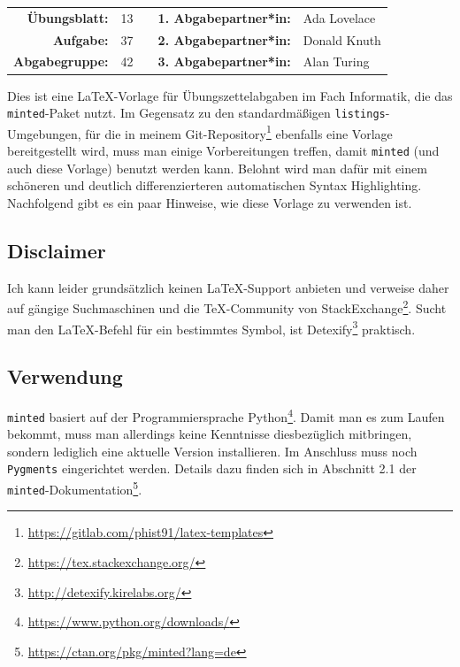 
\newcommand{\obenlinks}{Übungen zur Vorlesung Informatik I}   %



\begin{center} %
  \begin{tabular}{|rlp{4cm}rl|}
    \hline
    \textbf{Übungsblatt:} & 13 &  & \textbf{1. Abgabepartner*in:} & Ada Lovelace \\
    \textbf{Aufgabe:} & 37 &  & \textbf{2. Abgabepartner*in:} & Donald Knuth \\
    \textbf{Abgabegruppe:} & 42 &  & \textbf{3. Abgabepartner*in:} & Alan Turing  \\ \hline
  \end{tabular}
\end{center} 

Dies ist eine \LaTeX-Vorlage für Übungszettelabgaben im Fach Informatik, die das \texttt{minted}-Paket nutzt.
Im Gegensatz zu den standardmäßigen \texttt{listings}-Umgebungen, für die in meinem Git-Repository\footnote{\url{https://gitlab.com/phist91/latex-templates}} ebenfalls eine Vorlage bereitgestellt wird, muss man einige Vorbereitungen treffen, damit \texttt{minted} (und auch diese Vorlage) benutzt werden kann.
Belohnt wird man dafür mit einem schöneren und deutlich differenzierteren automatischen Syntax Highlighting.
Nachfolgend gibt es ein paar Hinweise, wie diese Vorlage zu verwenden ist.

\subsection*{Disclaimer}
Ich kann leider grundsätzlich keinen \LaTeX-Support anbieten und verweise daher auf gängige Suchmaschinen und die \TeX-Community von StackExchange\footnote{\url{https://tex.stackexchange.org/}}.    
Sucht man den LaTeX-Befehl für ein bestimmtes Symbol, ist Detexify\footnote{\url{http://detexify.kirelabs.org/}} praktisch.

\subsection*{Verwendung}
\texttt{minted} basiert auf der Programmiersprache Python\footnote{\url{https://www.python.org/downloads/}}.
Damit man es zum Laufen bekommt, muss man allerdings keine Kenntnisse diesbezüglich mitbringen, sondern lediglich eine aktuelle Version installieren.
Im Anschluss muss noch \texttt{Pygments} eingerichtet werden.
Details dazu finden sich in Abschnitt 2.1 der \texttt{minted}-Dokumentation\footnote{\url{https://ctan.org/pkg/minted?lang=de}}.

